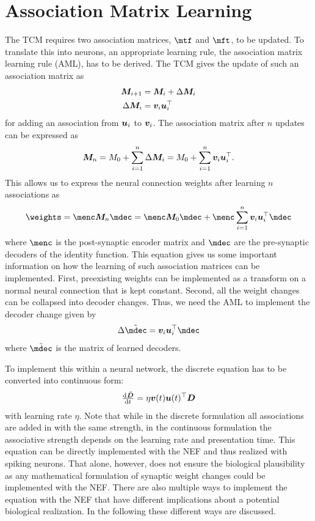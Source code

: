 \chapter{Association Matrix Learning}\label{sec:aml}

The TCM requires two association matrices, $\mtf$ and $\mft$, to be updated.
To translate this into neurons, an appropriate learning rule, the association matrix learning rule (AML), has to be derived.
The TCM gives the update of such an association matrix as
\begin{eqnarray}
    \bm{M}_{i+1} &= \bm{M}_i + \Delta \bm{M}_i \\
    \Delta \bm{M}_i &= \bm{v}_i \bm{u}_i^{\top}
\end{eqnarray}
for adding an association from $\bm{u}_i$ to $\bm{v}_i$.
The association matrix after $n$ updates can be expressed as
\begin{equation}
    \bm{M}_n = M_0 + \sum_{i=1}^{n} \Delta \bm{M}_i = M_0 + \sum_{i=1}^n \bm{v}_i \bm{u}_i^{\top} \text{.}
\end{equation}
This allows us to express the neural connection weights after learning $n$ associations as
\begin{equation}
    \weights = \menc \mat M_n \mdec = \menc \mat M_0 \mdec + \menc \sum_{i=1}^n \vc v_i \vc u_i\Tr \mdec
\end{equation}
where $\menc$ is the post-synaptic encoder matrix and $\mdec$ are the pre-synaptic decoders of the identity function.
This equation gives us some important information on how the learning of such association matrices can be implemented.
First, preexisting weights can be implemented as a transform on a normal neural connection that is kept constant.
Second, all the weight changes can be collapsed into decoder changes.
Thus, we need the AML to implement the decoder change given by
\begin{equation}
    \Delta \tilde{\mdec} = \vc v_i \vc u_i\Tr \mdec
\end{equation}
where $\tilde{\mdec}$ is the matrix of learned decoders.

To implement this within a neural network, the discrete equation has to be converted into continuous form:
\begin{equation}
    \od{\tilde{\mat D}}{t} = \eta \vc v(t) \vc u(t)\Tr \mat D \label{eqn:aml}
\end{equation}
with learning rate $\eta$.
Note that while in the discrete formulation all associations are added in with the same strength, in the continuous formulation the associative strength depends on the learning rate and presentation time.
This equation can be directly implemented with the NEF and thus realized with spiking neurons.
That alone, however, does not ensure the biological plausibility as any mathematical formulation of synaptic weight changes could be implemented with the NEF\@.
There are also multiple ways to implement the equation with the NEF that have different implications about a potential biological realization.
In the following these different ways are discussed.


